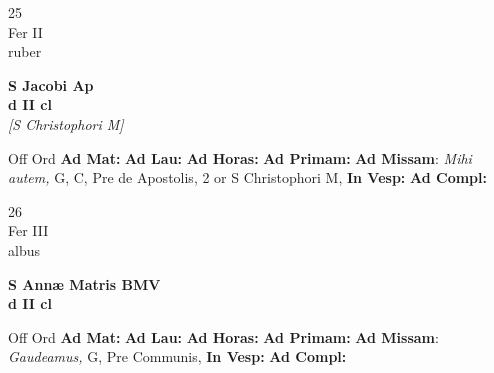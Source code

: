 \documentclass[10pt, openany]{book}
\begin{document}
    \begin{center}
        \begin{minipage}{3.5in}
            \vspace{2em}
            \begin{minipage}{0.5in}
                {\Huge 25} \\
                {\normalsize Fer II} \\
                {\normalsize ruber}
            \end{minipage}
            \begin{minipage}{3.0in}
                \textbf{ \large S Jacobi Ap \\
                \textnormal{\normalsize d II cl}} \\ \textit{[S Christophori M]} \\ 
            \end{minipage}
            \begin{justify}Off Ord
                \textbf{Ad Mat: }
                \textbf{Ad Lau: }
                \textbf{Ad Horas: }
                \textbf{Ad Primam: }\textbf{Ad Missam}: \textit{Mihi autem,} G, C, Pre de Apostolis, 2 or S Christophori M,  
                \textbf{In Vesp: }
                \textbf{Ad Compl: }
            \end{justify}
        \end{minipage}
    \end{center}

    \begin{center}
        \begin{minipage}{3.5in}
            \vspace{2em}
            \begin{minipage}{0.5in}
                {\Huge 26} \\
                {\normalsize Fer III} \\
                {\normalsize albus}
            \end{minipage}
            \begin{minipage}{3.0in}
                \textbf{ \large S Annæ Matris BMV \\
                \textnormal{\normalsize d II cl}} \\ 
            \end{minipage}
            \begin{justify}Off Ord
                \textbf{Ad Mat: }
                \textbf{Ad Lau: }
                \textbf{Ad Horas: }
                \textbf{Ad Primam: }\textbf{Ad Missam}: \textit{Gaudeamus,} G, Pre Communis,  
                \textbf{In Vesp: }
                \textbf{Ad Compl: }
            \end{justify}
        \end{minipage}
    \end{center}
\end{document}

